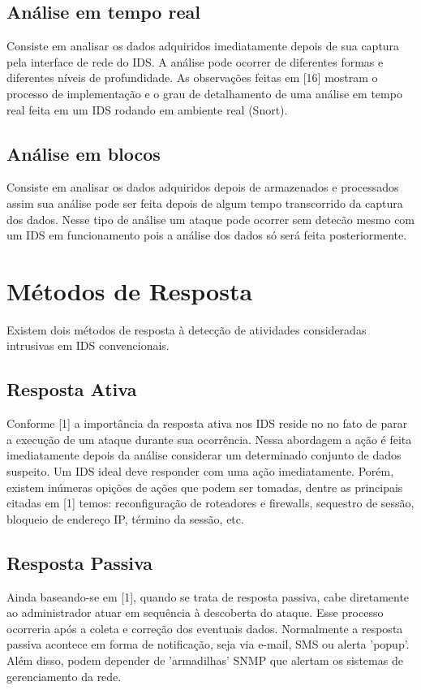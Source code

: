 \documentclass[conference]{IEEEtran}
\begin{document}
\subsection{Análise em tempo real}
Consiste em analisar os dados adquiridos imediatamente depois de sua captura pela interface de rede do IDS. A análise pode ocorrer de diferentes formas e diferentes níveis de profundidade. As observações feitas em [16] mostram o processo de implementação e o grau de detalhamento de uma análise em tempo real feita em um IDS rodando em ambiente real (Snort). 

\subsection{Análise em blocos}
Consiste em analisar os dados adquiridos depois de armazenados e processados assim sua análise pode ser feita depois de algum tempo transcorrido da captura dos dados. Nesse tipo de análise um ataque pode ocorrer sem detecão mesmo com um IDS em funcionamento pois a análise dos dados só será feita posteriormente.

\section{Métodos de Resposta}
Existem dois métodos de resposta à detecção de atividades consideradas intrusivas em IDS convencionais.

\subsection{Resposta Ativa}
Conforme [1] a importância da resposta ativa nos IDS reside no no fato de parar a execução de um ataque durante sua ocorrência. Nessa abordagem a ação é feita imediatamente depois da análise considerar um determinado conjunto de dados suspeito. Um IDS ideal deve responder com uma ação imediatamente. Porém, existem inúmeras opições de ações que podem ser tomadas, dentre as principais citadas em [1] temos: reconfiguração de roteadores e firewalls, sequestro de sessão, bloqueio de endereço IP, término da sessão, etc. 

\subsection{Resposta Passiva}
Ainda baseando-se em [1], quando se trata de resposta passiva, cabe diretamente ao administrador atuar em sequência à descoberta do ataque. Esse processo ocorreria após a coleta e correção dos eventuais dados.
Normalmente a resposta passiva acontece em forma de notificação, seja via e-mail, SMS ou alerta 'popup'. Além disso, podem depender de 'armadilhas' SNMP que alertam os sistemas de gerenciamento da rede.
\end{document}
